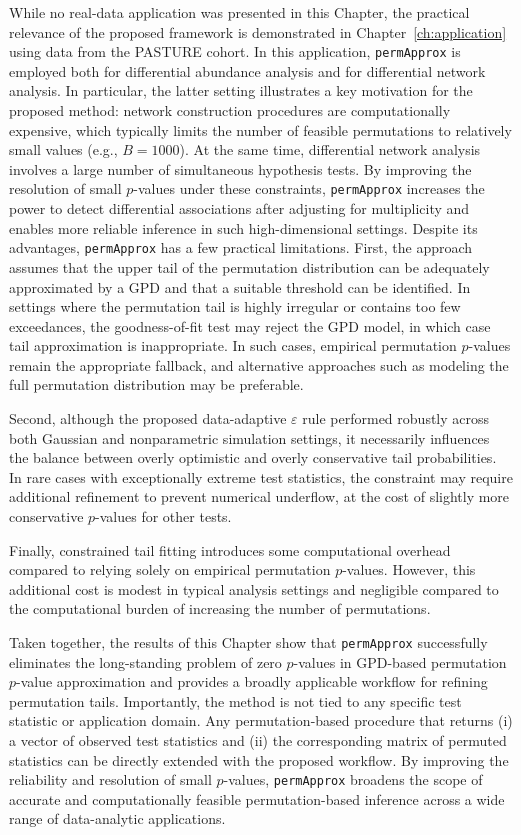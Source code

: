 While no real-data application was presented in this Chapter, the practical relevance of the proposed framework is demonstrated in Chapter~\ref{ch:application} using data from the PASTURE cohort. In this application, \texttt{permApprox} is employed both for differential abundance analysis and for differential network analysis. In particular, the latter setting illustrates a key motivation for the proposed method: network construction procedures are computationally expensive, which typically limits the number of feasible permutations to relatively small values (e.g., $B=1000$). At the same time, differential network analysis involves a large number of simultaneous hypothesis tests. By improving the resolution of small $p$-values under these constraints, \texttt{permApprox} increases the power to detect differential associations after adjusting for multiplicity and enables more reliable inference in such high-dimensional settings.
Despite its advantages, \texttt{permApprox} has a few practical limitations. First, the approach assumes that the upper tail of the permutation distribution can be adequately approximated by a GPD and that a suitable threshold can be identified. In settings where the permutation tail is highly irregular or contains too few exceedances, the goodness-of-fit test may reject the GPD model, in which case tail approximation is inappropriate. In such cases, empirical permutation $p$-values remain the appropriate fallback, and alternative approaches such as modeling the full permutation distribution may be preferable.

Second, although the proposed data-adaptive $\varepsilon$ rule performed robustly across both Gaussian and nonparametric simulation settings, it necessarily influences the balance between overly optimistic and overly conservative tail probabilities. In rare cases with exceptionally extreme test statistics, the constraint may require additional refinement to prevent numerical underflow, at the cost of slightly more conservative $p$-values for other tests.

Finally, constrained tail fitting introduces some computational overhead compared to relying solely on empirical permutation $p$-values. However, this additional cost is modest in typical analysis settings and negligible compared to the computational burden of increasing the number of permutations.

Taken together, the results of this Chapter show that \texttt{permApprox} successfully eliminates the long-standing problem of zero $p$-values in GPD-based permutation $p$-value approximation and provides a broadly applicable workflow for refining permutation tails. Importantly, the method is not tied to any specific test statistic or application domain. Any permutation-based procedure that returns (i) a vector of observed test statistics and (ii) the corresponding matrix of permuted statistics can be directly extended with the proposed workflow. By improving the reliability and resolution of small $p$-values, \texttt{permApprox} broadens the scope of accurate and computationally feasible permutation-based inference across a wide range of data-analytic applications.
